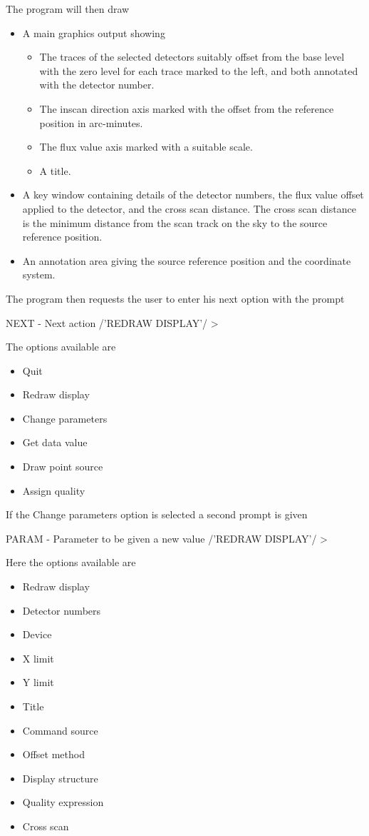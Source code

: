 \documentclass[twoside,11pt]{starlink}
\begin{document}
The program will then draw
\begin{itemize}
\item A main graphics output showing
\begin{itemize}
\item The traces of the selected detectors suitably offset from the base level
with the zero level for each trace marked to the left, and both annotated with
the detector number.
\item The inscan direction axis marked with the offset from the reference
position in arc-minutes.
\item The flux value axis marked with a suitable scale.
\item A title.
\end{itemize}
\item A key window containing details of the detector numbers, the flux value
offset applied to the detector, and the cross scan distance. The cross scan
distance is the minimum distance from the scan track on the sky to the source
reference position.
\item An annotation area giving the source reference position and the
coordinate system.
\end{itemize}
The program then requests the user to enter his next option with the prompt
\begin{small}
\begin{terminalv}
NEXT - Next action /'REDRAW DISPLAY'/ >
\end{terminalv}
\end{small}
The options available are
\begin{itemize}
\item Quit
\item Redraw display
\item Change parameters
\item Get data value
\item Draw point source
\item Assign quality
\end{itemize}
If the Change parameters option is selected a second prompt is given
\begin{small}
\begin{terminalv}
PARAM - Parameter to be given a new value /'REDRAW DISPLAY'/ >
\end{terminalv}
\end{small}
Here the options available are
\begin{itemize}
\item Redraw display
\item Detector numbers
\item Device
\item X limit
\item Y limit
\item Title
\item Command source
\item Offset method
\item Display structure
\item Quality expression
\item Cross scan
\end{itemize}
\end{document}
